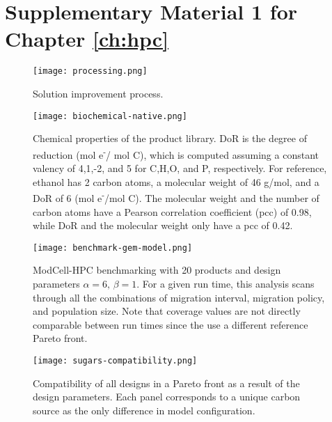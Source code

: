 
\renewcommand{\hbAppendixPrefix}{D}

\renewcommand{\thefigure}{\hbAppendixPrefix\arabic{figure}}
\setcounter{figure}{0}
\renewcommand{\thetable}{\hbAppendixPrefix\arabic{table}}
\setcounter{table}{0}
\renewcommand{\theequation}{\hbAppendixPrefix\arabic{equation}}
\setcounter{equation}{0}

\section{Supplementary Material 1 for Chapter \ref{ch:hpc}} \label{apx:sm1-hpc}

\begin{figure}[H]
    \caption{Solution improvement process.}
    \centering
    \texttt{[image: processing.png]}
    \label{fig7:processing}
\end{figure}

\begin{figure}[H]
    \caption[Chemical properties of the product library]{Chemical properties of the product library. DoR is the degree of reduction (mol e\textsuperscript{-}/ mol C), which is computed assuming a constant valency of 4,1,-2, and 5 for C,H,O, and P, respectively.  For reference, ethanol has 2 carbon atoms, a molecular weight of 46 g/mol, and a DoR of 6 (mol e\textsuperscript{-}/mol C). The molecular weight and the number of carbon atoms have a Pearson correlation coefficient (pcc) of 0.98, while DoR and the molecular weight only have a pcc of 0.42.}
    \centering
    \texttt{[image: biochemical-native.png]}
    \label{fig7:biochemical-properties}
\end{figure}

\begin{figure}[H]
    \caption[ModCell-HPC benchmarking with 20 products]{ModCell-HPC benchmarking with 20 products and design parameters $\alpha=6, \,\beta=1$. For a given run time, this analysis scans through all the combinations of migration interval, migration policy, and population size. Note that coverage values are not directly comparable between run times since the use a different reference Pareto front.}
    \centering
    \texttt{[image: benchmark-gem-model.png]}
    \label{fig7:benchmark-20prod}
\end{figure}

\begin{figure}[H]
    \caption[Compatibility distributions]{Compatibility of all designs in a Pareto front as a result of the design parameters. Each panel corresponds to a unique carbon source as the only difference in model configuration.}
    \centering
    \texttt{[image: sugars-compatibility.png]}
    \label{fig7:parameter-scan}
\end{figure}

